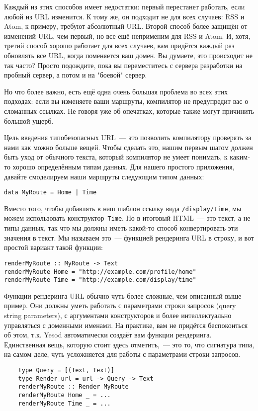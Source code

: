 Каждый из этих способов имеет недостатки: первый перестанет работать, если
любой из URL изменится. К тому же, он подходит не для всех случаев: RSS и Atom,
к примеру, требуют абсолютный URL. Второй способ более защищён от изменений
URL, чем первый, но все ещё неприменим для RSS и Atom.  И, хотя, третий способ
хорошо работает для всех случаев, вам придётся каждый раз обновлять все URL,
когда поменяется ваш домен.  Вы думаете, это происходит не так часто? Просто
подождите, пока вы переместитесь с сервера разработки на пробный сервер, а
потом и на "боевой" сервер.

Но что более важно, есть ещё одна очень большая проблема во всех этих подходах:
если вы изменяете ваши маршруты, компилятор не предупредит вас о сломанных
ссылках. Не говоря уже об опечатках, которые также могут причинить большой
ущерб.

Цель введения типобезопасных URL~--- это позволить компилятору проверять за
нами как можно больше вещей. Чтобы сделать это, нашим первым шагом должен быть
уход от обычного текста, который компилятор не умеет понимать, к каким-то
хорошо определённым типам данных. Для нашего простого приложения, давайте
смоделируем наши маршруты следующим типом данных:

\begin{lstlisting}
data MyRoute = Home | Time
\end{lstlisting}

Вместо того, чтобы добавлять в наш шаблон ссылку вида \texttt{/display/time},
мы можем использовать конструктор~\lstinline'Time'. Но в итоговый HTML~--- это
текст, а не типы данных, так что мы должны иметь какой-то способ конвертировать
эти значения в текст.  Мы называем это~--- функцией рендеринга URL в строку,
и вот простой вариант такой функции:

\begin{lstlisting}
renderMyRoute :: MyRoute -> Text
renderMyRoute Home = "http://example.com/profile/home"
renderMyRoute Time = "http://example.com/display/time"
\end{lstlisting}

\begin{remark}
    Функции рендеринга URL обычно чуть более сложные, чем описанный выше
    пример.  Они должны уметь работать с параметрами строки запросов (query
    string parameters), с аргументами конструкторов и более интеллектуально
    управляться с доменными именами.  На практике, вам не придётся беспокоиться
    об этом, т.к. Yesod автоматически создаёт вам функции рендеринга.
    Единственная вещь, которую стоит здесь отметить,~--- это то, что сигнатура
    типа, на самом деле, чуть усложняется для работы с параметрами строки
    запросов.

    \begin{lstlisting}
    type Query = [(Text, Text)]
    type Render url = url -> Query -> Text
    renderMyRoute :: Render MyRoute
    renderMyRoute Home _ = ...
    renderMyRoute Time _ = ...
    \end{lstlisting}
\end{remark}

